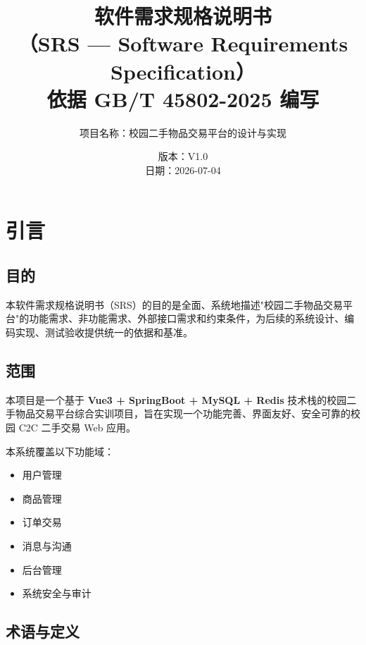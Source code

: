 \documentclass[12pt,a4paper,UTF8]{ctexart}
\title{\textbf{\Huge 软件需求规格说明书}\\[8pt]
       \large （SRS --- Software Requirements Specification）\\[12pt]
       \normalsize 依据 GB/T 45802-2025 编写}
\author{项目名称：校园二手物品交易平台的设计与实现}
\date{版本：V1.0\\[4pt] 日期：2026-07-04}
\begin{document}
\maketitle
\thispagestyle{empty}
\newpage

\tableofcontents
\newpage

\section{引言}

\subsection{目的}

本软件需求规格说明书（SRS）的目的是全面、系统地描述"校园二手物品交易平台"的功能需求、非功能需求、外部接口需求和约束条件，为后续的系统设计、编码实现、测试验收提供统一的依据和基准。

\subsection{范围}

本项目是一个基于 \textbf{Vue3 + SpringBoot + MySQL + Redis} 技术栈的校园二手物品交易平台综合实训项目，旨在实现一个功能完善、界面友好、安全可靠的校园 C2C 二手交易 Web 应用。

本系统覆盖以下功能域：
\begin{itemize}[itemsep=3pt]
    \item 用户管理
    \item 商品管理
    \item 订单交易
    \item 消息与沟通
    \item 后台管理
    \item 系统安全与审计
\end{itemize}

\subsection{术语与定义}
\end{document}
